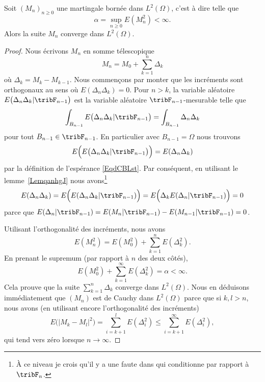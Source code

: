 \begin{theorem}     \label{ThobysyWI}
    Soit \( (M_n)_{n\geq 0}\) une martingale bornée dans \( L^2(\Omega)\), c'est à dire telle que
    \begin{equation}
        \alpha=\sup_{n\geq 0}E(M_n^2)<\infty.
    \end{equation}
    Alors la suite \( M_n\) converge dans \( L^2(\Omega)\).
\end{theorem}

\begin{proof}
    Nous écrivons \( M_n\) en somme télescopique
    \begin{equation}
        M_n=M_0+\sum_{k=1}^n\Delta_k
    \end{equation}
    où \( \Delta_k=M_k-M_{k-1}\). Nous commençons par monter que les incréments sont orthogonaux au sens où \( E(\Delta_n\Delta_k)=0\). Pour \( n>k\), la variable aléatoire \( E\big( \Delta_n\Delta_k|\tribF_{n-1} \big)\) est la variable aléatoire \( \tribF_{n-1}\)-mesurable telle que
    \begin{equation}
        \int_{B_{n-1}}E\big( \Delta_n\Delta_k|\tribF_{n-1} \big)=\int_{B_{n-1}}\Delta_n\Delta_k
    \end{equation}
    pour tout \( B_{n-1}\in\tribF_{n-1}\). En particulier avec \( B_{n-1}=\Omega\) nous trouvons
    \begin{equation}
        E\Big( E\big( \Delta_n\Delta_k|\tribF_{n-1} \big)\Big)=E(\Delta_n\Delta_k)
    \end{equation}
    par la définition de l'espérance \eqref{EqdCBLst}. Par conséquent, en utilisant le lemme~\ref{LemqanhgJ} nous avons\footnote{À ce niveau je crois qu'il y a une faute dans \cite{PMCmartinLP} qui conditionne par rapport à \( \tribF_n\).}
    \begin{equation}
        E(\Delta_n\Delta_k)=E\Big( E(\Delta_n\Delta_k|\tribF_{n-1}) \Big)=E\Big( \Delta_kE(\Delta_n|\tribF_{n-1}) \Big)=0
    \end{equation}
    parce que \( E(\Delta_n|\tribF_{n-1})=E(M_n|\tribF_{n-1})-E(M_{n-1}|\tribF_{n-1})=0\).

    Utilisant l'orthogonalité des incréments, nous avons
    \begin{equation}
        E(M_n^2)=E(M_0^2)+\sum_{k=1}^nE(\Delta_k^2).
    \end{equation}
    En prenant le supremum (par rapport à \( n\) des deux côtés),
    \begin{equation}
        E(M_0^2)+\sum_{k=1}^{\infty}E(\Delta_k^2)=\alpha<\infty.
    \end{equation}
    Cela prouve que la suite \( \sum_{k=1}^n\Delta_k\) converge dans \( L^2(\Omega)\). Nous en déduisons immédiatement que \( (M_n)\) est de Cauchy dans \( L^2(\Omega)\) parce que si \( k,l>n\), nous avons (en utilisant encore l'orthogonalité des incréments)
    \begin{equation}
        E\big( | M_k-M_l |^2 \big)=\sum_{i=k+1}^lE(\Delta_i^2)\leq\sum_{i=k+1}^{\infty}E(\Delta_i^2),
    \end{equation}
    qui tend vers zéro lorsque \( n\to\infty\).
\end{proof}

